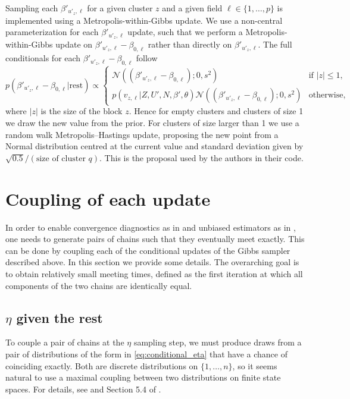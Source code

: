 \documentclass{article}
\begin{document}
Sampling each $\beta'_{{u'_z}, \ell}$ for a given cluster $z$ and a given field $\ell \in \{1, \ldots, p\} $ is implemented using a Metropolis-within-Gibbs update. We use a non-central parameterization for each $\beta'_{{u'_z}, \ell}$ update, such that we perform a Metropolis-within-Gibbs update on $\beta'_{{u'_z},\ell} - \beta_{0,\ell}$ rather than directly on $\beta'_{{u'_z},\ell}$. The full conditionals for each $\beta'_{{u'_z},\ell} - \beta_{0,\ell}$ follow
$$ p\left( \beta'_{{u'_z},\ell} - \beta_{0,\ell} |\text{rest}\right) \propto \left\{\begin{matrix}
\mathcal{N}((\beta'_{{u'_z},\ell} - \beta_{0,\ell}) ; 0, s^2) & \text{if  $|z|\leq 1$,}\\ 
p(v_{z,\ell}|Z, U', N, \beta', \theta) 
\mathcal{N}((\beta'_{{u'_z},\ell} - \beta_{0,\ell}); 0, s^2) & \text{otherwise,}
\end{matrix}\right. $$
where $|z|$ is the size of the block $z$. Hence for empty clusters and clusters of size 1 we draw the new value from the prior. For clusters of size larger than 1 we use a random walk Metropolis--Hastings update, proposing the new point from a Normal distribution centred at the current value and standard deviation given by
$\sqrt{0.5}/(\text{size of cluster }q)$. This is the proposal used by the authors in their code.

\section{Coupling of each update}

In order to enable convergence diagnostics as in \citet{biswas2019estimating} and unbiased estimators
as in \citet{jacob2017unbiased}, one needs to generate
pairs of chains such that they eventually meet exactly.
This can be done by coupling each of the conditional updates
of the Gibbs sampler described above.
In this section we provide some details. 
The overarching goal is to obtain relatively small meeting times,
defined as the first iteration at which all components of the two chains are identically equal.

\subsection{\texorpdfstring{$\eta$}{eta} given the rest}

To couple a pair of chains at the \texorpdfstring{$\eta$}{eta} sampling step, we must
produce draws from a pair of distributions of the form in \eqref{eq:conditional_eta} that have a chance of coinciding exactly. Both are discrete distributions on $\{1,\ldots,n\}$, so it seems natural to use a maximal coupling between two distributions on finite state spaces. For details, see \citet{johnson1998coupling} and Section 5.4 of \citet{jacob2017unbiased}.
\end{document}
